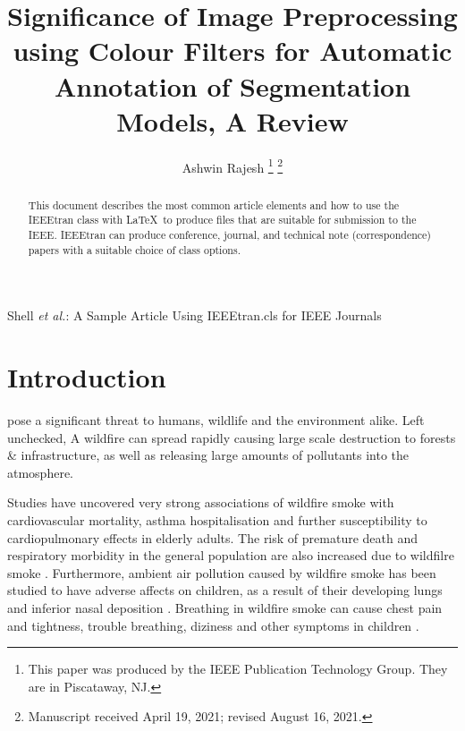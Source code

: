 \documentclass[lettersize,journal]{IEEEtran}
\begin{document}
\title{Significance of Image Preprocessing using Colour Filters for Automatic Annotation of Segmentation Models, A Review}

\author{Ashwin Rajesh
\thanks{This paper was produced by the IEEE Publication Technology Group. They are in Piscataway, NJ.}%
\thanks{Manuscript received April 19, 2021; revised August 16, 2021.}}

%
{Shell \MakeLowercase{\textit{et al.}}: A Sample Article Using IEEEtran.cls for IEEE Journals}


\maketitle

\begin{abstract}
        This document describes the most common article elements and how to use the IEEEtran class with \LaTeX \ to produce files that are suitable for submission to the IEEE.  IEEEtran can produce conference, journal, and technical note (correspondence) papers with a suitable choice of class options. 
\end{abstract}


\section{Introduction}
 pose a significant threat to humans, wildlife and the
environment alike. Left unchecked, A wildfire can spread rapidly causing
large scale destruction to forests \& infrastructure, as well as
releasing large amounts of pollutants into the atmosphere.

Studies have uncovered very strong associations of wildfire smoke with cardiovascular mortality, asthma hospitalisation and further susceptibility to cardiopulmonary effects in elderly adults.
The risk of premature death and respiratory morbidity in the general population are also increased due to wildfilre smoke \cite{wildfirehealth}.
Furthermore, ambient air pollution caused by wildfire smoke has been studied to have adverse affects on children, as a result of their developing lungs and inferior nasal deposition \cite{wildfirechildren}.
Breathing in wildfire smoke can cause chest pain and tightness, trouble breathing, diziness and other symptoms in children \cite{wildfirefactsheet}.
\end{document}
